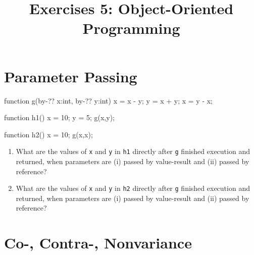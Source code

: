 \documentclass{article}
\begin{document}
\title{Exercises 5: Object-Oriented Programming}
\date{}

\maketitle

\section{Parameter Passing}

\begin{java}
function g(by-?? x:int, by-?? y:int) {
   x = x - y;
   y = x + y;
   x = y - x;
}

function h1() {
  x = 10;
  y = 5;
  g(x,y);
}

function h2() {
  x = 10;
  g(x,x);
}

\end{java}


\begin{enumerate}
  \item What are the values of \texttt{x} and \texttt{y} in
    \texttt{h1} directly after \texttt{g} finished execution and
    returned, when parameters are (i) passed by value-result and (ii)
    passed by reference?
  \item What are the values of \texttt{x} and \texttt{y} in
    \texttt{h2} directly after \texttt{g} finished execution and
    returned, when parameters are (i) passed by value-result and (ii)
    passed by reference?
\end{enumerate}

\section{Co-, Contra-, Nonvariance}
\end{document}
